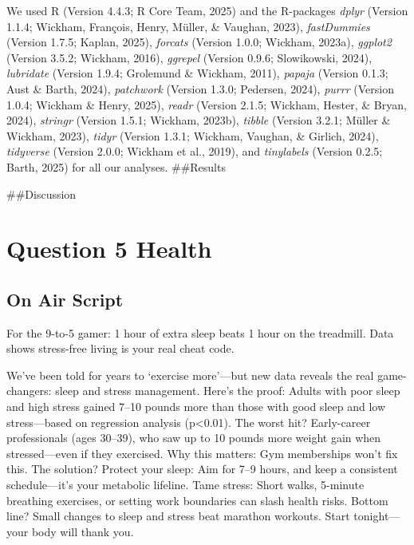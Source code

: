 \documentclass[
  man,floatsintext]{apa6}
\begin{document}
We used R (Version 4.4.3; R Core Team, 2025) and the R-packages \emph{dplyr} (Version 1.1.4; Wickham, François, Henry, Müller, \& Vaughan, 2023), \emph{fastDummies} (Version 1.7.5; Kaplan, 2025), \emph{forcats} (Version 1.0.0; Wickham, 2023a), \emph{ggplot2} (Version 3.5.2; Wickham, 2016), \emph{ggrepel} (Version 0.9.6; Slowikowski, 2024), \emph{lubridate} (Version 1.9.4; Grolemund \& Wickham, 2011), \emph{papaja} (Version 0.1.3; Aust \& Barth, 2024), \emph{patchwork} (Version 1.3.0; Pedersen, 2024), \emph{purrr} (Version 1.0.4; Wickham \& Henry, 2025), \emph{readr} (Version 2.1.5; Wickham, Hester, \& Bryan, 2024), \emph{stringr} (Version 1.5.1; Wickham, 2023b), \emph{tibble} (Version 3.2.1; Müller \& Wickham, 2023), \emph{tidyr} (Version 1.3.1; Wickham, Vaughan, \& Girlich, 2024), \emph{tidyverse} (Version 2.0.0; Wickham et al., 2019), and \emph{tinylabels} (Version 0.2.5; Barth, 2025) for all our analyses.
\#\#Results

\#\#Discussion

\section{Question 5 Health}\label{question-5-health}

\subsection{On Air Script}\label{on-air-script}

For the 9-to-5 gamer: 1 hour of extra sleep beats 1 hour on the treadmill. Data shows stress-free living is your real cheat code.

We've been told for years to `exercise more'---but new data reveals the real game-changers: sleep and stress management. Here's the proof: Adults with poor sleep and high stress gained 7--10 pounds more than those with good sleep and low stress---based on regression analysis (p\textless0.01). The worst hit? Early-career professionals (ages 30--39), who saw up to 10 pounds more weight gain when stressed---even if they exercised. Why this matters: Gym memberships won't fix this. The solution? Protect your sleep: Aim for 7--9 hours, and keep a consistent schedule---it's your metabolic lifeline. Tame stress: Short walks, 5-minute breathing exercises, or setting work boundaries can slash health risks. Bottom line? Small changes to sleep and stress beat marathon workouts. Start tonight---your body will thank you.
\end{document}
